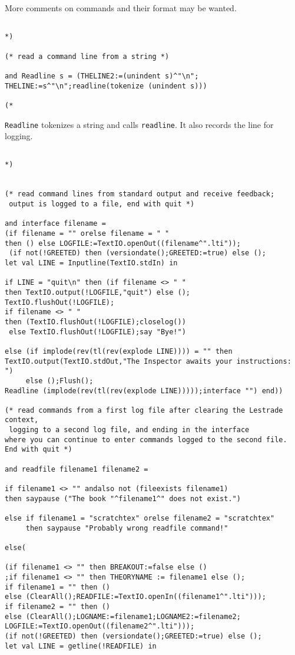 \documentclass{article}
\begin{document}
More comments on commands and their format may be wanted.

\begin{verbatim}

*)

(* read a command line from a string *)

and Readline s = (THELINE2:=(unindent s)^"\n";
THELINE:=s^"\n";readline(tokenize (unindent s)))

(*

\end{verbatim}

{\tt Readline} tokenizes a string and calls {\tt readline}.  It also records the line for logging.

\begin{verbatim}

*)


(* read command lines from standard output and receive feedback;
 output is logged to a file, end with quit *)

and interface filename =
(if filename = "" orelse filename = " " 
then () else LOGFILE:=TextIO.openOut((filename^".lti"));
 (if not(!GREETED) then (versiondate();GREETED:=true) else ();
let val LINE = Inputline(TextIO.stdIn) in

if LINE = "quit\n" then (if filename <> " " 
then TextIO.output(!LOGFILE,"quit") else ();
TextIO.flushOut(!LOGFILE);
if filename <> " " 
then (TextIO.flushOut(!LOGFILE);closelog())
 else TextIO.flushOut(!LOGFILE);say "Bye!")

else (if implode(rev(tl(rev(explode LINE)))) = "" then 
TextIO.output(TextIO.stdOut,"The Inspector awaits your instructions:  ") 
     else ();Flush();
Readline (implode(rev(tl(rev(explode LINE)))));interface "") end))

(* read commands from a first log file after clearing the Lestrade context,
 logging to a second log file, and ending in the interface 
where you can continue to enter commands logged to the second file.  End with quit *)

and readfile filename1 filename2 =

if filename1 <> "" andalso not (fileexists filename1) 
then saypause ("The book "^filename1^" does not exist.")

else if filename1 = "scratchtex" orelse filename2 = "scratchtex" 
     then saypause "Probably wrong readfile command!"

else(

(if filename1 <> "" then BREAKOUT:=false else ()
;if filename1 <> "" then THEORYNAME := filename1 else (); 
if filename1 = "" then () 
else (ClearAll();READFILE:=TextIO.openIn((filename1^".lti"))); 
if filename2 = "" then () 
else (ClearAll();LOGNAME:=filename1;LOGNAME2:=filename2;
LOGFILE:=TextIO.openOut((filename2^".lti"))); 
(if not(!GREETED) then (versiondate();GREETED:=true) else ();
let val LINE = getline(!READFILE) in


\end{verbatim}
\end{document}
